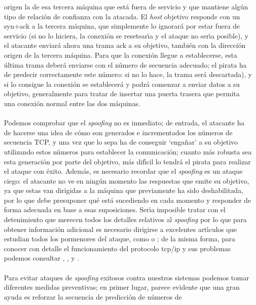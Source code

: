 origen la de esa tercera m\'aquina que est\'a fuera de servicio y que mantiene 
alg\'un tipo de relaci\'on de confianza con la atacada. El {\it host} objetivo 
responde con un {\sc syn+ack} a la tercera m\'aquina, que simplemente lo 
ignorar\'a por estar fuera de servicio (si no lo hiciera, la 
conexi\'on se resetear\'{\i}a y el ataque no ser\'{\i}a posible), y el atacante 
enviar\'a ahora una trama {\sc ack} a su objetivo, tambi\'en con la direcci\'on
origen de la tercera m\'aquina. Para que la conexi\'on llegue a establecerse, 
esta \'ultima trama deber\'a enviarse con el n\'umero de secuencia adecuado; el
pirata ha de predecir correctamente este n\'umero: si no lo hace, la trama 
ser\'a descartada), y si lo consigue la conexi\'on se establecer\'a y podr\'a 
comenzar a enviar datos a su objetivo, generalmente para tratar de insertar una 
puerta trasera que permita una conexi\'on normal entre las dos m\'aquinas.\\
\\Podemos comprobar que el {\it spoofing} no es inmediato; de entrada, el 
atacante ha 
de hacerse una idea de c\'omo son generados e incrementados los n\'umeros 
de secuencia TCP, y una vez que lo sepa ha de conseguir `enga\~nar' a su 
objetivo utilizando estos n\'umeros para establecer la comunicaci\'on; cuanto 
m\'as robusta sea esta generaci\'on por parte del objetivo, m\'as dif\'{\i}cil 
lo tendr\'a el pirata para realizar el ataque con \'exito. Adem\'as, es 
necesario recordar que el {\it spoofing} es un ataque ciego: el atacante no ve 
en ning\'un momento las respuestas que emite su objetivo, ya que estas van 
dirigidas a la m\'aquina que previamente ha sido deshabilitada, por lo que debe 
presuponer qu\'e est\'a sucediendo en cada momento y responder de forma 
adecuada en base a esas suposiciones. Ser\'{\i}a imposible tratar con el 
detenimiento que merecen todos los detalles relativos al {\it spoofing} por lo 
que para obtener informaci\'on adicional es necesario dirigirse a excelentes 
art\'{\i}culos que estudian todos los pormenores del ataque, como 
\cite{kn:dae96b} o \cite{kn:tod96}; de la misma forma, para conocer con detalle 
el funcionamiento del protocolo {\sc tcp/ip} y sus problemas podemos consultar 
\cite{kn:ste94}, \cite{kn:tan96}, \cite{kn:bel89} y \cite{kn:mor85}.\\
\\Para evitar ataques de {\it spoofing} exitosos contra nuestros sistemas 
podemos tomar diferentes medidas preventivas; en primer lugar, parece evidente
que una gran ayuda es reforzar la secuencia de predicci\'on de n\'umeros de
